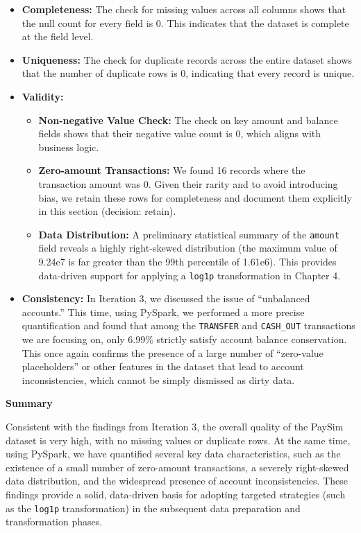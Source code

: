 \documentclass[sigplan,screen]{acmart}
\begin{document}
\begin{itemize}
\item \textbf{Completeness:} The check for missing values across all columns shows that the null count for every field is 0. This indicates that the dataset is complete at the field level.
\item \textbf{Uniqueness:} The check for duplicate records across the entire dataset shows that the number of duplicate rows is 0, indicating that every record is unique.
\item \textbf{Validity:}
\begin{itemize}
\item \textbf{Non-negative Value Check:} The check on key amount and balance fields shows that their negative value count is 0, which aligns with business logic.
\item \textbf{Zero-amount Transactions:} We found 16 records where the transaction amount was 0. Given their rarity and to avoid introducing bias, we retain these rows for completeness and document them explicitly in this section (decision: retain).
\item \textbf{Data Distribution:} A preliminary statistical summary of the \texttt{amount} field reveals a highly right-skewed distribution (the maximum value of 9.24e7 is far greater than the 99th percentile of 1.61e6). This provides data-driven support for applying a \texttt{log1p} transformation in Chapter 4.
\end{itemize}
\item \textbf{Consistency:} In Iteration 3, we discussed the issue of ``unbalanced accounts.'' This time, using PySpark, we performed a more precise quantification and found that among the \texttt{TRANSFER} and \texttt{CASH\_OUT} transactions we are focusing on, only 6.99\% strictly satisfy account balance conservation. This once again confirms the presence of a large number of ``zero-value placeholders'' or other features in the dataset that lead to account inconsistencies, which cannot be simply dismissed as dirty data.
\end{itemize}

\textbf{Summary}

Consistent with the findings from Iteration 3, the overall quality of the PaySim dataset is very high, with no missing values or duplicate rows. At the same time, using PySpark, we have quantified several key data characteristics, such as the existence of a small number of zero-amount transactions, a severely right-skewed data distribution, and the widespread presence of account inconsistencies. These findings provide a solid, data-driven basis for adopting targeted strategies (such as the \texttt{log1p} transformation) in the subsequent data preparation and transformation phases.
\end{document}

